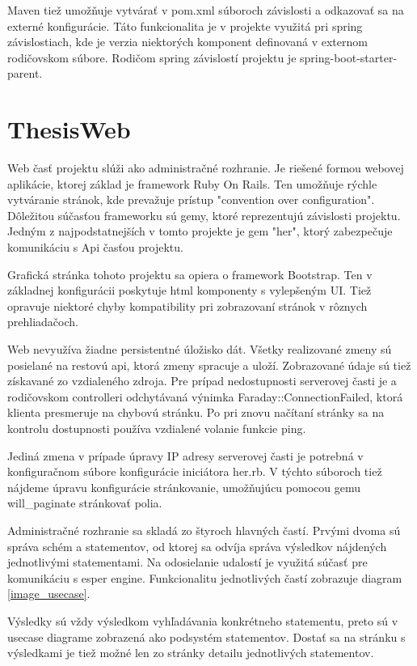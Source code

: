 		Maven tiež umožňuje vytvárať v pom.xml súboroch závislosti a odkazovať sa na externé konfigurácie. Táto funkcionalita je v projekte využitá pri spring závislostiach, kde je verzia niektorých komponent definovaná v externom rodičovskom súbore. Rodičom spring závislostí projektu je spring-boot-starter-parent.
		
\section{ThesisWeb}
	Web časť projektu slúži ako administračné rozhranie. Je riešené formou webovej aplikácie, ktorej základ je framework Ruby On Rails. Ten umožňuje rýchle vytváranie stránok, kde prevažuje prístup "convention over configuration". Dôležitou súčasťou frameworku sú gemy, ktoré reprezentujú závislosti projektu. Jedným z najpodstatnejších v tomto projekte je gem "her", ktorý zabezpečuje komunikáciu s Api časťou projektu.
	
	
	Grafická stránka tohoto projektu sa opiera o framework Bootstrap. Ten v základnej konfigurácii poskytuje html komponenty s vylepšeným UI. Tiež opravuje niektoré chyby kompatibility pri zobrazovaní stránok v rôznych prehliadačoch.
	
	Web nevyužíva žiadne persistentné úložisko dát. Všetky realizované zmeny sú posielané na restovú api, ktorá zmeny spracuje a uloží. Zobrazované údaje sú tiež získavané zo vzdialeného zdroja.
	Pre prípad nedostupnosti serverovej časti je a rodičovskom controlleri odchytávaná výnimka Faraday::ConnectionFailed, ktorá klienta presmeruje na chybovú stránku. Po pri znovu načítaní stránky sa na kontrolu dostupnosti používa vzdialené volanie funkcie ping.
	
	Jediná zmena v prípade úpravy IP adresy serverovej časti je potrebná v konfiguračnom súbore konfigurácie iniciátora her.rb. V týchto súboroch tiež nájdeme úpravu konfigurácie stránkovanie, umožňujúcu pomocou gemu will\_paginate stránkovať polia.

	Administračné rozhranie sa skladá zo štyroch hlavných častí. Prvými dvoma sú správa schém a statementov, od ktorej sa odvíja správa výsledkov nájdených jednotlivými statementami. Na odosielanie udalostí je využitá súčasť pre komunikáciu s esper engine. Funkcionalitu jednotlivých častí zobrazuje diagram \ref{image_usecase}.
	
	Výsledky sú vždy výsledkom vyhľadávania konkrétneho statementu, preto sú v usecase diagrame zobrazená ako podsystém statementov. Dostať sa na stránku s výsledkami je tiež možné len zo stránky detailu jednotlivých statementov.

